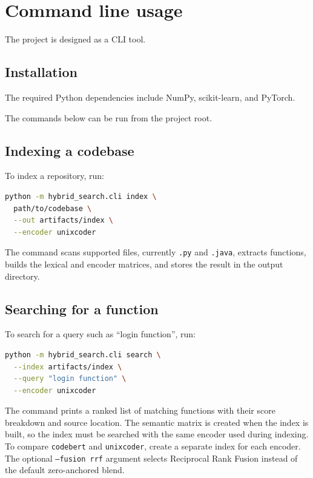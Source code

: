 \documentclass[12pt]{article}
\begin{document}
\section{Command line usage}
\label{sec:usage}

The project is designed as a CLI tool.

\subsection{Installation}
\label{subsec:install}

The required Python dependencies include NumPy, scikit-learn, and PyTorch.

\noindent
The commands below can be run from the project root.

\subsection{Indexing a codebase}
\label{subsec:indexing}

To index a repository, run:

\begin{lstlisting}[language=bash]
python -m hybrid_search.cli index \
  path/to/codebase \
  --out artifacts/index \
  --encoder unixcoder
\end{lstlisting}

The command scans supported files, currently \texttt{.py} and \texttt{.java}, extracts functions, builds the lexical and encoder matrices, and stores the result in the output directory.

\subsection{Searching for a function}
\label{subsec:searching}

To search for a query such as ``login function'', run:

\begin{lstlisting}[language=bash]
python -m hybrid_search.cli search \
  --index artifacts/index \
  --query "login function" \
  --encoder unixcoder
\end{lstlisting}

The command prints a ranked list of matching functions with their score breakdown and source location.
The semantic matrix is created when the index is built, so the index must be searched with the same encoder used during indexing.
To compare \texttt{codebert} and \texttt{unixcoder}, create a separate index for each encoder.
The optional \texttt{--fusion rrf} argument selects Reciprocal Rank Fusion instead of the default zero-anchored blend.
\end{document}
